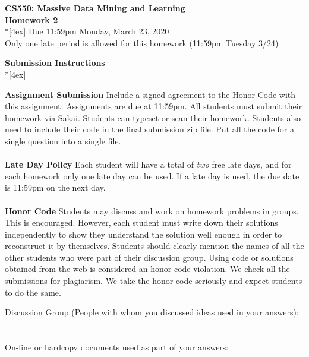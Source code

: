 \documentclass[11pt]{article}
\begin{document}
\thispagestyle{empty}
\parindent 0pt
\vfill
\large

\begin{center}
\LARGE{\bf \textsf{CS550: Massive Data Mining and Learning}}\\ {\bf \textsf{Homework 2}} 
\\*[4ex]
Due 11:59pm Monday, March 23, 2020\\
Only one late period is allowed for this homework (11:59pm Tuesday 3/24)
\end{center}

\pagebreak[4]
\begin{center}
\LARGE{\bf \textsf{Submission Instructions}} \\*[4ex]
\end{center}

\textbf{Assignment Submission } Include a signed agreement to the Honor Code with this assignment. Assignments are due at 11:59pm. All students must submit their homework via Sakai. Students can typeset or scan their homework. Students also need to include their code in the final submission zip file. Put all the code for a single question into a single file. 
\\
\\
\textbf{Late Day Policy } Each student will have a total of {\em two} free late days, and for each homework only one late day can be used. If a late day is used, the due date is 11:59pm on the next day.
\\
\\
\textbf{Honor Code } Students may discuss and work on homework problems in groups. This is encouraged. However, each student must write down their solutions independently to show they understand the solution well enough in order to reconstruct it by themselves.  Students should clearly mention the names of all the other students who were part of their discussion group. Using code or solutions obtained from the web is considered an honor code violation. We check all the submissions for plagiarism. We take the honor code seriously and expect students to do the same. 

\vfill
\vfill

Discussion Group (People with whom you discussed ideas used in your answers): \\\\\\
On-line or hardcopy documents used as part of your answers: \\\\\\
\vfill
\end{document}
